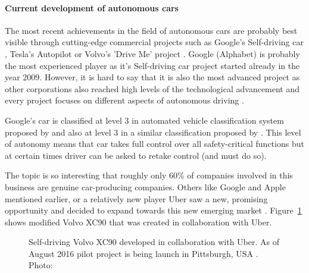 \documentclass[11pt,english]{article}
\begin{document}
\paragraph{Current development of autonomous cars}

\par
The most recent achievements in the field of autonomous cars are probably best visible through cutting-edge commercial projects such as Google's Self-driving car \citep{google1}, Tesla's Autopilot \citep{tesla1} or Volvo's 'Drive Me' project \citep{volvo1}. Google (Alphabet) is probably the most experienced player as it's Self-driving car project started already in the year 2009. However, it is hard to say  that it is also the most advanced project as other corporations also reached high levels of the technological advancement and every project focuses on different aspects of autonomous driving \citep{33comp}. 
\par
Google's car is classified at level 3 in automated vehicle classification system proposed by \citet{nhtsa1} and also at level 3 in a similar classification proposed by \citet{sae1}. This level of autonomy means that car takes full control over all safety-critical functions but at certain times driver can be asked to retake control (and must do so).  
\par
The topic is so interesting that roughly only 60\% of companies involved in this business are genuine car-producing companies. Others like Google and Apple mentioned earlier, or a relatively new player Uber saw a new, promising opportunity and decided to expand towards this new emerging market \citep{33comp}. Figure~\ref{fig:volvo} shows modified Volvo XC90 that was created in collaboration with Uber.

\begin{figure}[!] %
\caption{Self-driving Volvo XC90 developed in collaboration with Uber. As of August 2016 pilot project is being launch in Pittsburgh, USA \citep{uberpittsburgh}. Photo: \citet{volvo1}}
\label{fig:volvo}
\end{figure} 
\end{document}
